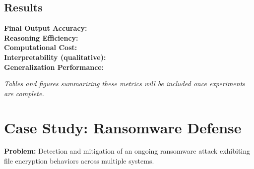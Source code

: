 \documentclass[10pt,journal,compsoc]{IEEEtran}
\begin{document}
\subsection{Results}

\textbf{Final Output Accuracy:} \\
\textbf{Reasoning Efficiency:} \\
\textbf{Computational Cost:} \\
\textbf{Interpretability (qualitative):} \\
\textbf{Generalization Performance:}

\emph{Tables and figures summarizing these metrics will be included once
experiments are complete.}

\section{Case Study: Ransomware Defense}

\textbf{Problem:} Detection and mitigation of an ongoing ransomware attack exhibiting file encryption behaviors across multiple systems.
\end{document}
